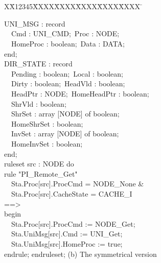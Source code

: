 \documentclass{llncs-new}
\newlength{\fminilength}
\newenvironment{fmini}[1][\linewidth]
  {\setlength{\fminilength}{#1\fboxsep-2\fboxrule}%
   \vspace{2ex}\noindent\begin{lrbox}{\fminibox}\begin{minipage}{\fminilength}%
   \mbox{ }\hfill\vspace{-2.5ex}}%
  {\end{minipage}\end{lrbox}\vspace{1ex}\hspace{0ex}%
   \framebox{\usebox{\fminibox}}}
\newenvironment{specification}
{\noindent\scriptsize
\tt\begin{fmini}\begin{tabbing}X\=X12345\=XXXX\=XXXX\=XXXX\=XXXX\=XXXX
\=\+\kill} {\end{tabbing}\normalfont\end{fmini}}
\def \twoSpaces {\ \ }
\def \twoSpaces {\ \ }
\begin{document}
\begin{specification}
\begin{minipage}[t]{0.4\linewidth}
UNI\_MSG : record\\
\indent \twoSpaces  Cmd : UNI\_CMD;\     Proc : NODE;\\
\indent \twoSpaces     HomeProc : boolean;\       Data : DATA;\\
  end;\\
  DIR\_STATE : record\\
\indent \twoSpaces    Pending : boolean;\     Local : boolean;\\
\indent \twoSpaces     Dirty : boolean;\      HeadVld : boolean;\\
\indent \twoSpaces     HeadPtr : NODE;\      HomeHeadPtr : boolean;\\
\indent \twoSpaces     ShrVld : boolean;\\
\indent \twoSpaces     ShrSet : array [NODE] of boolean;\\
\indent \twoSpaces     HomeShrSet : boolean;\\
\indent \twoSpaces     InvSet : array [NODE] of boolean;\\
\indent \twoSpaces     HomeInvSet : boolean;\\
  end;\\
  ruleset src : NODE do\\
rule "PI\_Remote\_Get"\\
\indent \twoSpaces   Sta.Proc[src].ProcCmd = NODE\_None \&\\
\indent \twoSpaces   Sta.Proc[src].CacheState = CACHE\_I\\
==>\\
begin\\
\indent \twoSpaces   Sta.Proc[src].ProcCmd := NODE\_Get;\\
\indent \twoSpaces   Sta.UniMsg[src].Cmd := UNI\_Get;\\
\indent \twoSpaces   Sta.UniMsg[src].HomeProc := true;\\
endrule; endruleset;
\center (b) The symmetrical version\\
\end{minipage}
\end{specification}
\end{document}
